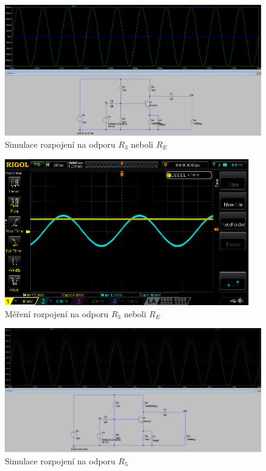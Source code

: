\documentclass{article}
\begin{document}

\begin{figure}[H]
  \centering
  \includegraphics[width=\textwidth]{sim/ukol1/porucha2.png}
  \caption{Simulace rozpojení na odporu \(R_3\) neboli \(R_{E}\)}
  \label{fig:sch-se-p2}
\end{figure}

\begin{figure}[H]
  \centering
  \includegraphics[width=0.95\textwidth]{mereni/NewFolder1/NewFile3.png}
  \caption{Měření rozpojení na odporu \(R_3\) neboli \(R_{E}\)}
  \label{fig:m-sch-se-p1}
\end{figure}


\begin{figure}[H]
  \centering
  \includegraphics[width=\textwidth]{sim/ukol1/rozpojeni_na_RC.png}
  \caption{Simulace rozpojení na odporu \(R_5\)}
  \label{fig:sch-se-p3}
\end{figure}
\end{document}
